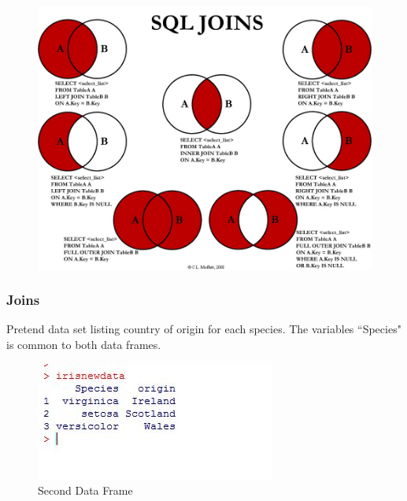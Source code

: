 \documentclass{beamer}
\begin{document}
\begin{frame}
	\begin{figure}
		\centering
		\includegraphics[width=1.00\linewidth]{images/SQLjoins}
		
	\end{figure}
	
\end{frame}
\begin{frame}
	\frametitle{Joins}
	Pretend data set listing country of origin for each species.
	The variables ``Species" is common to both data frames.
	\begin{figure}
		\centering
		\includegraphics[width=0.7\linewidth]{images/irisnewdata}
		\caption{Second Data Frame}
		\label{fig:irisnewdata}
	\end{figure}
	
\end{frame}
\end{document}
